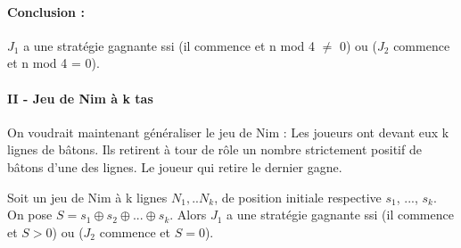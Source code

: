 \paragraph{Conclusion : \\}
$J_{1}$ a une stratégie gagnante ssi (il commence et n mod 4 $\neq$ 0) ou ($J_{2}$ commence et n mod 4 = 0).

\paragraph{II - Jeu de Nim à k tas}

\begin{com}
	On voudrait maintenant généraliser le jeu de Nim : Les joueurs ont devant eux k lignes de bâtons. Ils retirent à tour de rôle un nombre strictement positif de bâtons d'une des lignes. Le joueur qui retire le dernier gagne. 
\end{com}

\begin{proposition}
	Soit un jeu de Nim à k lignes $N_{1}, .. N_{k}$, de position initiale respective $s_{1}$, ..., $s_{k}$. On pose $S = s_{1} \oplus s_{2}\oplus ... \oplus s_{k}$. Alors $J_{1}$ a une stratégie gagnante ssi (il commence et $S > 0$) ou ($J_{2}$ commence et $S = 0$). 
\end{proposition}

